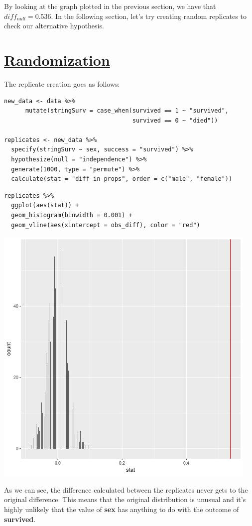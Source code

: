\documentclass[11pt]{article}
\begin{document}
By looking at the graph plotted in the previous section, we have that \(diff_{null} = 0.536\). In the following section, let's try creating random replicates to check our alternative hypothesis.

\section{\underline{Randomization}}
\label{sec:org2262463}

The replicate creation goes as follows:

\begin{verbatim}
new_data <- data %>%
      mutate(stringSurv = case_when(survived == 1 ~ "survived",
                                    survived == 0 ~ "died"))

replicates <- new_data %>%
  specify(stringSurv ~ sex, success = "survived") %>%
  hypothesize(null = "independence") %>%
  generate(1000, type = "permute") %>%
  calculate(stat = "diff in props", order = c("male", "female"))
\end{verbatim}

\begin{verbatim}
replicates %>%
  ggplot(aes(stat)) +
  geom_histogram(binwidth = 0.001) +
  geom_vline(aes(xintercept = obs_diff), color = "red")
\end{verbatim}

\begin{center}
\includegraphics[width=.9\linewidth]{replicates_comparison.png}
\end{center}


As we can see, the difference calculated between the replicates never gets to the original difference. This means that the original distribution is unusual and it's highly unlikely that the value of \textbf{sex} has anything to do with the outcome of \textbf{survived}.
\end{document}
